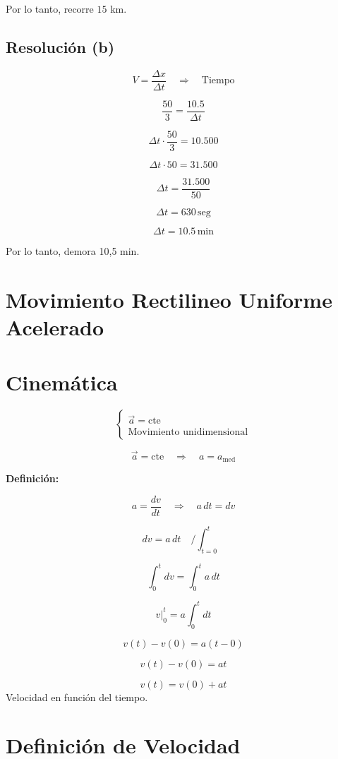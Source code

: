 Por lo tanto, recorre $15$ km.

\subsection{Resolución (b)}

\[
V = \frac{\Delta x}{\Delta t} \quad \Rightarrow \quad \text{Tiempo}
\]

\[
\frac{50}{3} = \frac{10.5}{\Delta t}
\]

\[
\Delta t \cdot \frac{50}{3} = 10.500
\]

\[
\Delta t \cdot 50 = 31.500
\]

\[
\Delta t = \frac{31.500}{50}
\]

\[
\Delta t = 630 \, \text{seg}
\]

\[
\Delta t = 10.5 \, \text{min}
\]

 Por lo tanto, demora 10,5 min.

\newpage
\section{Movimiento Rectilineo Uniforme Acelerado}
\section{Cinemática}

\[
\begin{cases}
    \vec{a} = \text{cte} \\
    \text{Movimiento unidimensional}
\end{cases}
\]

\[
\vec{a} = \text{cte} \quad \Rightarrow \quad a = a_{\text{med}}
\]

\textbf{Definición:} 

\[
a = \frac{dv}{dt} \quad \Rightarrow \quad a \, dt = dv
\]

\[
dv = a \, dt \quad \Big/ \int_{t=0}^{t}
\]

\[
\int_{0}^{t} dv = \int_{0}^{t} a \, dt
\]

\[
v \big|_{0}^{t} = a \int_{0}^{t} dt
\]

\[
v(t) - v(0) = a (t - 0)
\]

\[
v(t) - v(0) = a t
\]

\[
\boxed{v(t) = v(0) + a t}
\]
Velocidad en función del tiempo.

\section{Definición de Velocidad}

